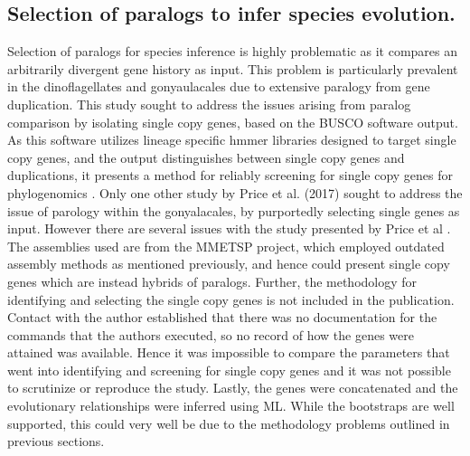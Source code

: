 \documentclass[12pt]{article}
\begin{document}
\subsection*{Selection of paralogs to infer species evolution.}
Selection of paralogs for species inference is highly problematic as it compares an arbitrarily divergent gene history as input. 
This problem is particularly prevalent in the dinoflagellates and gonyaulacales due to extensive paralogy from gene duplication. 
This study sought to address the issues arising from paralog comparison by isolating single copy genes, based on the BUSCO software output. 
As this software utilizes lineage specific hmmer libraries designed to target single copy genes, and the output distinguishes between single copy genes and duplications, it presents a method for reliably screening for single copy genes for phylogenomics \cite{waterhouse2017busco}.
Only one other study by Price et al. (2017) sought to address the issue of parology within the gonyalacales, by purportedly selecting single genes as input. 
However there are several issues with the study presented by Price et al \cite{price2017robust}. 
The assemblies used are from the MMETSP project, which employed outdated assembly methods as mentioned previously, and hence could present single copy genes which are instead hybrids of paralogs. 
Further, the methodology for identifying and selecting the single copy genes is not included in the publication. 
Contact with the author established that there was no documentation for the commands that the authors executed, so no record of how the genes were attained was available. 
Hence it was impossible to compare the parameters that went into identifying and screening for single copy genes and it was not possible to scrutinize or reproduce the study.
Lastly, the genes were concatenated and the evolutionary relationships were inferred using ML. 
While the bootstraps are well supported, this could very well be due to the methodology problems outlined in previous sections.
\end{document}
